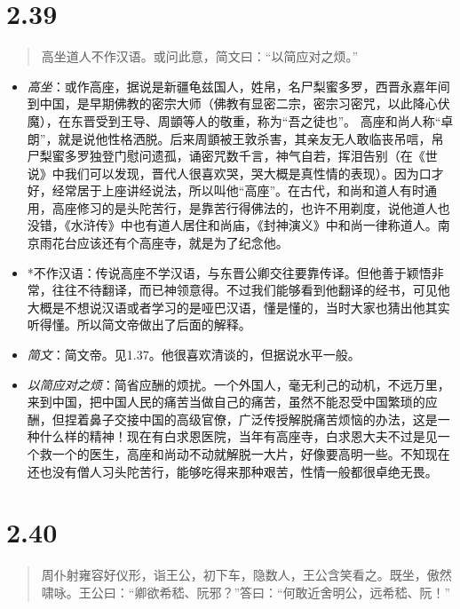 \documentclass[]{book}
\providecommand{\tightlist}{%
  \setlength{\itemsep}{0pt}\setlength{\parskip}{0pt}}
\begin{document}
\section{2.39}\label{section-85}

\begin{quote}
高坐道人不作汉语。或问此意，简文曰：``以简应对之烦。''
\end{quote}

\begin{itemize}
\tightlist
\item
  \emph{高坐}：或作高座，据说是新疆龟兹国人，姓帛，名尸梨蜜多罗，西晋永嘉年间到中国，是早期佛教的密宗大师（佛教有显密二宗，密宗习密咒，以此降心伏魔），在东晋受到王导、周顗等人的敬重，称为``吾之徒也''。
  高座和尚人称``卓朗''，就是说他性格洒脱。后来周顗被王敦杀害，其亲友无人敢临丧吊唁，帛尸梨蜜多罗独登门慰问遗孤，诵密咒数千言，神气自若，挥泪告别（在《世说》中我们可以发现，晋代人很喜欢哭，哭大概是真性情的表现）。因为口才好，经常居于上座讲经说法，所以叫他``高座''。在古代，和尚和道人有时通用，高座修习的是头陀苦行，是靠苦行得佛法的，也许不用剃度，说他道人也没错，《水浒传》中也有道人居住和尚庙，《封神演义》中和尚一律称道人。南京雨花台应该还有个高座寺，就是为了纪念他。
\item
  *不作汉语：传说高座不学汉语，与东晋公卿交往要靠传译。但他善于颖悟非常，往往不待翻译，而已神领意得。不过我们能够看到他翻译的经书，可见他大概是不想说汉语或者学习的是哑巴汉语，懂是懂的，当时大家也猜出他其实听得懂。所以简文帝做出了后面的解释。
\item
  \emph{简文}：简文帝。见1.37。他很喜欢清谈的，但据说水平一般。
\item
  \emph{以简应对之烦}：简省应酬的烦扰。一个外国人，毫无利己的动机，不远万里，来到中国，把中国人民的痛苦当做自己的痛苦，虽然不能忍受中国繁琐的应酬，但捏着鼻子交接中国的高级官僚，广泛传授解脱痛苦烦恼的办法，这是一种什么样的精神！现在有白求恩医院，当年有高座寺，白求恩大夫不过是见一个救一个的医生，高座和尚动不动就解脱一大片，好像要高明一些。不知现在还也没有僧人习头陀苦行，能够吃得来那种艰苦，性情一般都很卓绝无畏。
\end{itemize}

\section{2.40}\label{section-86}

\begin{quote}
周仆射雍容好仪形，诣王公，初下车，隐数人，王公含笑看之。既坐，傲然啸咏。王公曰：``卿欲希嵇、阮邪？''答曰：``何敢近舍明公，远希嵇、阮！''
\end{quote}
\end{document}
